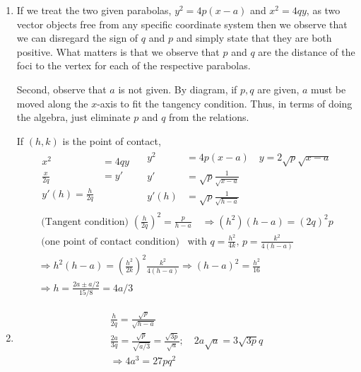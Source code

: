 \documentclass[twoside]{amsart}
\theoremstyle{plain}
\theoremstyle{definition}
\newcommand{\exercisehead}[1]
  {\smallskip
   \noindent{\small\bf Exercise #1.}}
\begin{document}
\exercisehead{17} 
\begin{enumerate}
\item If we treat the two given parabolas, $y^2 = 4p(x-a)$ and $x^2 = 4qy$, as two vector objects free from any specific coordinate system then we observe that we can disregard the sign of $q$ and $p$ and simply state that they are both positive.  What matters is that we observe that $p$ and $q$ are the distance of the foci to the vertex for each of the respective parabolas.  

Second, observe that $a$ is not given.  By diagram, if $p,q$ are given, $a$ must be moved along the $x$-axis to fit the tangency condition.  Thus, in terms of doing the algebra, just eliminate $p$ and $q$ from the relations.  

If $(h,k)$ is the point of contact, 
\[
\begin{gathered}
\begin{aligned}
  x^2 & = 4qy \\
  \frac{x}{2q} & = y' \\
  y'(h) = \frac{h}{2q} 
\end{aligned}
\quad 
\begin{aligned}
  y^2 & = 4p (x-a) \quad y = 2\sqrt{ p } \sqrt{x-a} \\
  y' & = \sqrt{p} \frac{1}{ \sqrt{x-a}} \\
  y'(h) & = \sqrt{p} \frac{1}{ \sqrt{h-a }}
\end{aligned} \\
\text{ (Tangent condition) } \left( \frac{h}{2q} \right)^2 = \frac{ p }{ h-a}  \quad \Longrightarrow (h^2)(h-a) = (2q)^2 p  \\
\text{ (one point of contact condition) } \, \text{ with } q = \frac{h^2}{ 4k }, \, p = \frac{k^2}{4(h-a)}   \\
\Longrightarrow h^2(h-a) = \left( \frac{h^2}{ 2k} \right)^2 \frac{k^2}{ 4(h-a) }  \Longrightarrow (h-a)^2 = \frac{h^2}{16} \\
\Longrightarrow h = \frac{ 2a \pm a/2}{ 15/8} = \boxed{ 4a/3}
\end{gathered}
\]
\item \[
\begin{gathered}
  \frac{h}{2q} = \frac{ \sqrt{p}}{ \sqrt{ h-a} } \\
  \frac{2a}{3q} = \frac{ \sqrt{p}}{ \sqrt{ a/3}} = \frac{\sqrt{3p}}{ \sqrt{a}}; \quad 2a\sqrt{a} = 3\sqrt{3p} q \\
  \Longrightarrow 4a^3 = 27 pq^2
\end{gathered}
\]
\end{enumerate}
\end{document}
